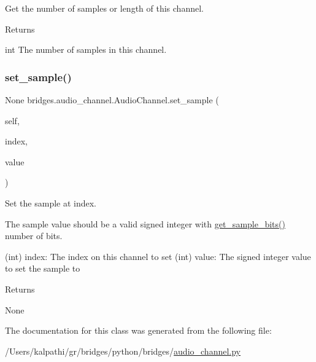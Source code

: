 Get the number of samples or length of this channel. 

\begin{DoxyReturn}{Returns}


int The number of samples in this channel. 
\end{DoxyReturn}
\mbox{\label{classbridges_1_1audio__channel_1_1_audio_channel_a963deb0f627c15ad43e354dc239a22ff}} 
\subsubsection{\texorpdfstring{set\_sample()}{set\_sample()}}
{\footnotesize\ttfamily  None bridges.\+audio\+\_\+channel.\+Audio\+Channel.\+set\+\_\+sample (\begin{DoxyParamCaption}\item[{}]{self,  }\item[{int}]{index,  }\item[{int}]{value }\end{DoxyParamCaption})}



Set the sample at index. 

The sample value should be a valid signed integer with \mbox{\hyperlink{classbridges_1_1audio__channel_1_1_audio_channel_a6ee6a46e925354fd26f8f67e3357c2b4}{get\+\_\+sample\+\_\+bits()}} number of bits. \begin{DoxyVerb}           (int) index: The index on this channel to set
           (int) value: The signed integer value to set the sample to
\end{DoxyVerb}
 \begin{DoxyReturn}{Returns}


None 
\end{DoxyReturn}


The documentation for this class was generated from the following file\+:\begin{DoxyCompactItemize}
\item 
/\+Users/kalpathi/gr/bridges/python/bridges/\mbox{\hyperlink{audio__channel_8py}{audio\+\_\+channel.\+py}}\end{DoxyCompactItemize}
